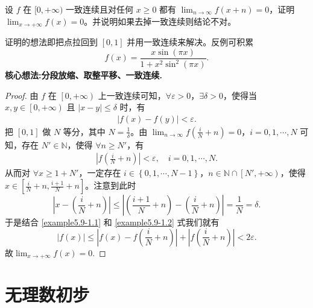 \documentclass[lang=cn,newtx,10pt,scheme=chinese]{elegantbook}
\begin{document}
\begin{example}
设 \( f \) 在 \([0,+\infty)\) 一致连续且对任何 \( x \geq 0 \) 都有 \(\lim_{n \to \infty} f(x+n) = 0\)，证明 \(\lim_{x \to +\infty} f(x) = 0\)。并说明如果去掉一致连续则结论不对。
\end{example}
\begin{note}
证明的想法即把点拉回到 \([0,1]\) 并用一致连续来解决。反例可积累
\[
f(x) = \frac{x \sin (\pi x)}{1 + x^2 \sin^2 (\pi x)}.
\]
\textbf{核心想法:分段放缩、取整平移、一致连续.}
\end{note}
\begin{proof}
由 $f$ 在 $\left[ 0, +\infty \right)$ 上一致连续可知，$\forall \varepsilon > 0$，$\exists \delta > 0$，使得当 $x, y \in \left[ 0, +\infty \right)$ 且 $\left| x - y \right| \leqslant \delta$ 时，有
\begin{align}
\left| f\left( x \right) - f\left( y \right) \right| < \varepsilon. \label{example5.9-1.1}
\end{align}
把 $\left[ 0,1 \right]$ 做 $N$ 等分，其中 $N = \frac{1}{\delta}$。由 $\lim_{n \rightarrow \infty} f\left( \frac{i}{N} + n \right) = 0$，$i = 0, 1, \cdots, N$ 可知，存在 $N' \in \mathbb{N}$，使得 $\forall n \geqslant N'$，有
\begin{align}
\left| f\left( \frac{i}{N} + n \right) \right| < \varepsilon, \quad i = 0, 1, \cdots, N. \label{example5.9-1.2} 
\end{align}
从而对 $\forall x \geqslant 1 + N'$，一定存在 $i \in \left\{ 0, 1, \cdots, N - 1 \right\}$，$n \in \mathbb{N} \cap \left[ N', +\infty \right)$，使得 $x \in \left[ \frac{i}{N} + n, \frac{i + 1}{N} + n \right]$。注意到此时
\[
\left| x - \left( \frac{i}{N} + n \right) \right| \leqslant \left| \left( \frac{i + 1}{N} + n \right) - \left( \frac{i}{N} + n \right) \right| = \frac{1}{N} = \delta.
\]
于是结合 \eqref{example5.9-1.1} 和 \eqref{example5.9-1.2} 式我们就有
\[
\left| f\left( x \right) \right| \leqslant \left| f\left( x \right) - f\left( \frac{i}{N} + n \right) \right| + \left| f\left( \frac{i}{N} + n \right) \right| < 2\varepsilon.
\]
故\(\lim_{x \to +\infty} f(x) = 0\).
\end{proof}









\chapter{无理数初步}
\end{document}

